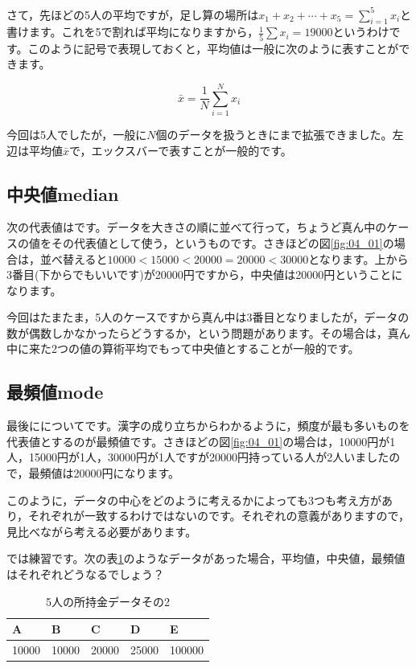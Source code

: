\documentclass{ltjbook}
\begin{document}
さて，先ほどの5人の平均ですが，足し算の場所は$x_1+x_2+\cdots+x_5=\sum_{i=1}^5 x_i$と書けます。これを5で割れば平均になりますから，$\frac{1}{5}\sum x_i = 19000$というわけです。このように記号で表現しておくと，平均値は一般に次のように表すことができます。

\[ \bar{x} = \frac{1}{N}\sum_{i=1}^N x_i \]

今回は5人でしたが，一般に$N$個のデータを扱うときにまで拡張できました。左辺は平均値$\bar{x}$で，エックスバーで表すことが一般的です。
\subsection{中央値median}
次の代表値はです。データを大きさの順に並べて行って，ちょうど真ん中のケースの値をその代表値として使う，というものです。さきほどの図\ref{fig:04_01}の場合は，並べ替えると$10000<15000<20000=20000<30000$となります。上から3番目(下からでもいいです)が20000円ですから，中央値は20000円ということになります。

今回はたまたま，5人のケースですから真ん中は3番目となりましたが，データの数が偶数しかなかったらどうするか，という問題があります。その場合は，真ん中に来た2つの値の算術平均でもって中央値とすることが一般的です。

\subsection{最頻値mode}
最後にについてです。漢字の成り立ちからわかるように，頻度が最も多いものを代表値とするのが最頻値です。さきほどの図\ref{fig:04_01}の場合は，10000円が1人，15000円が1人，30000円が1人ですが20000円持っている人が2人いましたので，最頻値は20000円になります。

このように，データの中心をどのように考えるかによっても3つも考え方があり，それぞれが一致するわけではないのです。それぞれの意義がありますので，見比べながら考える必要があります。

では練習です。次の表\ref{tbl::04_01}のようなデータがあった場合，平均値，中央値，最頻値はそれぞれどうなるでしょう？

\begin{table}[ht]
	\centering
	\caption{5人の所持金データその2}
	\begin{tabular}{lllll}
		A     & B     & C     & D     & E      \\\hline
		10000 & 10000 & 20000 & 25000 & 100000 \\
	\end{tabular}
	\label{tbl::04_01}
\end{table}
\end{document}
